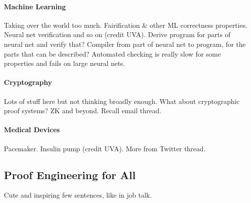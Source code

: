 \paragraph{Machine Learning}
Taking over the world too much.
Fairification \& other ML correctness properties. Neural net verification and so on (credit UVA).
Derive program for parts of neural net and verify that? Compiler from part of neural net to program, for the parts that can be described?
Automated checking is really slow for some properties and fails on large neural nets.

\paragraph{Cryptography} Lots of stuff here but not thinking broadly enough. What about cryptographic proof systems? ZK and beyond. Recall email thread.

\paragraph{Medical Devices} Pacemaker. Insulin pump (credit UVA). More from Twitter thread.

\subsection*{Proof Engineering for All}

Cute and inspiring few sentences, like in job talk.

